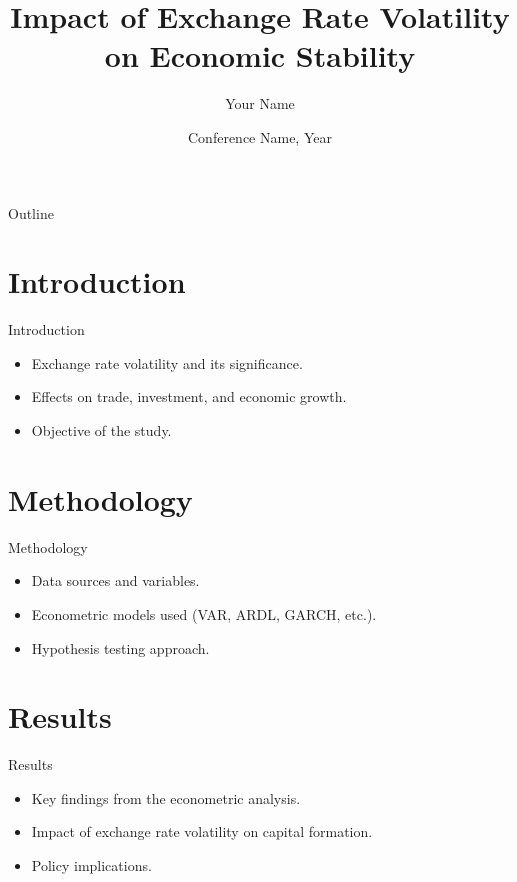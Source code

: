 \documentclass{beamer}
\title{Impact of Exchange Rate Volatility on Economic Stability}
\author{Your Name}
\institute{Your Institution}
\date{Conference Name, Year}
\begin{document}
\begin{frame}
    \titlepage
\end{frame}

\begin{frame}{Outline}
    \tableofcontents
\end{frame}

\section{Introduction}
\begin{frame}{Introduction}
    \begin{itemize}
        \item Exchange rate volatility and its significance.
        \item Effects on trade, investment, and economic growth.
        \item Objective of the study.
    \end{itemize}
\end{frame}

\section{Methodology}
\begin{frame}{Methodology}
    \begin{itemize}
        \item Data sources and variables.
        \item Econometric models used (VAR, ARDL, GARCH, etc.).
        \item Hypothesis testing approach.
    \end{itemize}
\end{frame}

\section{Results}
\begin{frame}{Results}
    \begin{itemize}
        \item Key findings from the econometric analysis.
        \item Impact of exchange rate volatility on capital formation.
        \item Policy implications.
    \end{itemize}
\end{frame}
\end{document}
